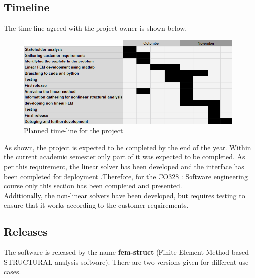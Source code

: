 \documentclass[12pt]{article}
\begin{document}
\subsection{Timeline}
The time line agreed with the project owner is shown below.\\
\begin{figure}[H]
    \centering
    \includegraphics[width=\textwidth]{images/timeline.png}
    \caption{Planned time-line for the project}
    \label{fig:groups}
\end{figure}

As shown, the project is expected to be completed by the end of the year. Within the current academic semester only part of it was expected to be completed. As per this requirement, the linear solver has been developed and the interface has been completed for deployment .Therefore, for the CO328 : Software engineering course only this section has been completed and presented.\\
Additionally, the non-linear solvers have been developed, but requires testing to ensure that it works according to the customer requirements.

\subsection{Releases}

The software is released by the name \textbf{fem-struct} (Finite Element Method based STRUCTURAL analysis software). There are two versions given for different use cases.\\
\end{document}
